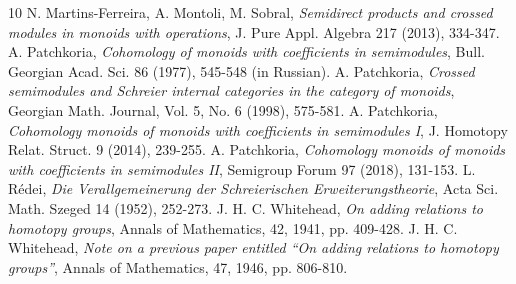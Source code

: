 \documentclass[a4paper]{amsart}
\theoremstyle{plain}
\theoremstyle{definition}
\theoremstyle{remark}
\begin{document}
\begin{thebibliography}{10}
 N. Martins-Ferreira, A. Montoli, M. Sobral, \emph{Semidirect products and crossed modules in monoids with operations}, J. Pure Appl. Algebra 217 (2013), 334-347.
 A. Patchkoria, \emph{Cohomology of monoids with coefficients in semimodules}, Bull. Georgian Acad. Sci. 86 (1977), 545-548 (in Russian).
 A. Patchkoria, \emph{Crossed semimodules and Schreier internal categories in the category of monoids}, Georgian Math. Journal, Vol. 5, No. 6 (1998), 575-581.
 A. Patchkoria, \emph{Cohomology monoids of monoids with coefficients in semimodules I}, J. Homotopy Relat. Struct. 9 (2014), 239-255.
 A. Patchkoria, \emph{Cohomology monoids of monoids with coefficients in semimodules II}, Semigroup Forum 97 (2018), 131-153.
 L. R\'{e}dei, \emph{Die Verallgemeinerung der Schreierischen Erweiterungstheorie}, Acta Sci. Math. Szeged 14 (1952), 252-273.
 J. H. C. Whitehead, \emph{On adding relations to homotopy groups}, Annals of Mathematics, 42, 1941, pp. 409-428.
 J. H. C. Whitehead, \emph{Note on a previous paper entitled ``On adding relations to homotopy groups''}, Annals of Mathematics, 47, 1946, pp. 806-810.
\end{thebibliography}
\end{document}
